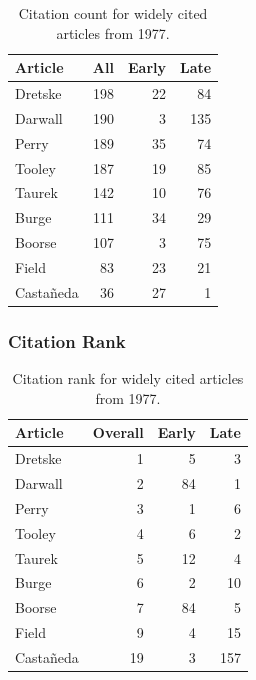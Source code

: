 \documentclass[
  10pt,
  letterpaper,
  DIV=11,
  numbers=noendperiod,
  twoside]{scrartcl}
\begin{document}
\begin{longtable}[]{@{}lrrr@{}}

\caption{\label{tbl-citation-count-1977}Citation count for widely cited
articles from 1977.}

\tabularnewline

\toprule\noalign{}
Article & All & Early & Late \\
\midrule\noalign{}
\endhead
\bottomrule\noalign{}
\endlastfoot
Dretske & 198 & 22 & 84 \\
Darwall & 190 & 3 & 135 \\
Perry & 189 & 35 & 74 \\
Tooley & 187 & 19 & 85 \\
Taurek & 142 & 10 & 76 \\
Burge & 111 & 34 & 29 \\
Boorse & 107 & 3 & 75 \\
Field & 83 & 23 & 21 \\
Castañeda & 36 & 27 & 1 \\

\end{longtable}

\subsubsection*{Citation Rank}\label{citation-rank-1}

\begin{longtable}[]{@{}lrrr@{}}

\caption{\label{tbl-citation-rank-1977}Citation rank for widely cited
articles from 1977.}

\tabularnewline

\toprule\noalign{}
Article & Overall & Early & Late \\
\midrule\noalign{}
\endhead
\bottomrule\noalign{}
\endlastfoot
Dretske & 1 & 5 & 3 \\
Darwall & 2 & 84 & 1 \\
Perry & 3 & 1 & 6 \\
Tooley & 4 & 6 & 2 \\
Taurek & 5 & 12 & 4 \\
Burge & 6 & 2 & 10 \\
Boorse & 7 & 84 & 5 \\
Field & 9 & 4 & 15 \\
Castañeda & 19 & 3 & 157 \\

\end{longtable}
\end{document}

